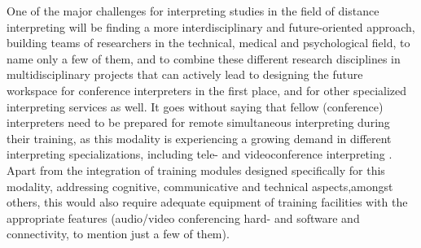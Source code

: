\documentclass[output=paper]{langsci/langscibook}
\begin{document}
One of the major challenges for interpreting studies in the field of distance interpreting will be finding a more interdisciplinary and future-oriented approach, building teams of researchers in the technical, medical and psychological field, to name only a few of them, and to combine these different research disciplines in multidisciplinary projects that can actively lead to designing the future work\-space for conference interpreters in the first place, and for other specialized interpreting services as well. It goes without saying that fellow (conference) interpreters need to be prepared for remote simultaneous interpreting during their training, as this modality is experiencing a growing demand in different interpreting specializations, including tele- and videoconference interpreting \citep{Braun2015}. Apart from the integration of training modules designed specifically for this modality, addressing cognitive, communicative and technical aspects,\linebreak amongst others, this would also require adequate equipment of training facilities with the appropriate features (audio/video conferencing hard- and software and connectivity, to mention just a few of them).
 
\nocite{ISO2603,ISO4043,AVIDICUS1,AVIDICUS2,AVIDICUS3}
{\sloppy\printbibliography[heading=subbibliography,notkeyword=this]}
\end{document}
